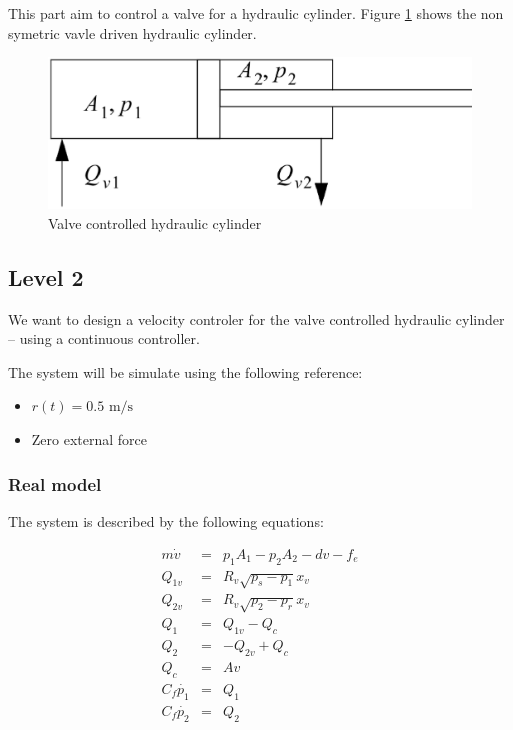 This part aim to control a valve for a hydraulic cylinder. Figure \ref{valve} shows the non symetric vavle driven hydraulic cylinder. 

\begin{figure}[hb]
 \includegraphics[width=\linewidth]{fig/valve.ps}
 \caption{Valve controlled hydraulic cylinder}
 \label{valve}
\end{figure}

\subsection*{Level 2}

We want to design a velocity controler for the valve controlled hydraulic cylinder -- using a continuous controller. 

The system will be simulate using the following reference:
\begin{itemize}
 \item $r(t) = 0.5 \text{ m/s}$
 \item Zero external force
\end{itemize}


\subsubsection*{Real model}
The system is described by the following equations:

$$
\begin{array}{rcl}
    m \dot{v} & = & p_1 A_1 - p_2 A_2 - d v - f_e \\
    Q_{1v} & = & R_v \sqrt{p_s - p_1} x_v \\
    Q_{2v} & = & R_v \sqrt{p_2 - p_r} x_v \\
    Q_1 & = & Q_{1v} - Q_c \\
    Q_2 & = & - Q_{2v} + Q_c \\
    Q_c & = & A v \\
    C_f \dot{p_1} & = & Q_1 \\
    C_f \dot{p_2} & = & Q_2 \\
\end{array}
$$

